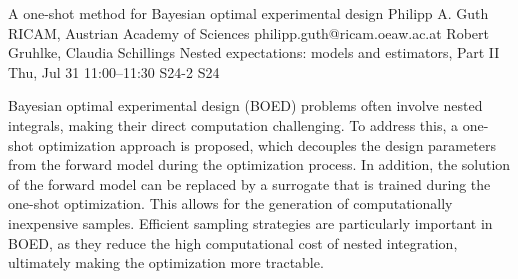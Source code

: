 \begin{talk}
  {A one-shot method for Bayesian optimal experimental design}%
  {Philipp A. Guth}%
  {RICAM, Austrian Academy of Sciences}%
  {philipp.guth@ricam.oeaw.ac.at}%
  {Robert Gruhlke, Claudia Schillings}%
  {Nested expectations: models and estimators, Part II}%
  {Thu, Jul 31 11:00–11:30}%
  {S24-2}%
  {S24}%
				
		
Bayesian optimal experimental design (BOED) problems often involve nested integrals, making their direct computation challenging. To address this, a one-shot optimization approach is proposed, which decouples the design parameters from the forward model during the optimization process. In addition, the solution of the forward model can be replaced by a surrogate that is trained during the one-shot optimization. This allows for the generation of computationally inexpensive samples. Efficient sampling strategies are particularly important in BOED, as they reduce the high computational cost of nested integration, ultimately making the optimization more tractable.



%
%
\end{talk}

